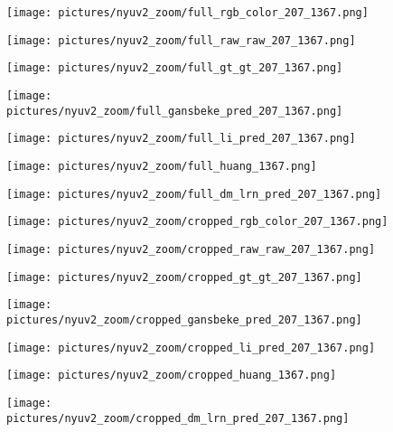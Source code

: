 \documentclass[final]{cvpr}
\begin{document}
    
    \begin{figure*}[!t]
    \setlength{\columnsep}{2pt}
    \setlength\multicolsep{0pt}
            \begin{multicols}{7}
            \texttt{[image: pictures/nyuv2\_zoom/full\_rgb\_color\_207\_1367.png]}\par
            \texttt{[image: pictures/nyuv2\_zoom/full\_raw\_raw\_207\_1367.png]}\par
            \texttt{[image: pictures/nyuv2\_zoom/full\_gt\_gt\_207\_1367.png]}\par 
            \texttt{[image: pictures/nyuv2\_zoom/full\_gansbeke\_pred\_207\_1367.png]}\par 
            \texttt{[image: pictures/nyuv2\_zoom/full\_li\_pred\_207\_1367.png]}\par
            \texttt{[image: pictures/nyuv2\_zoom/full\_huang\_1367.png]}\par 
            \texttt{[image: pictures/nyuv2\_zoom/full\_dm\_lrn\_pred\_207\_1367.png]}\par 
        \end{multicols}

        \begin{multicols}{7}
            \texttt{[image: pictures/nyuv2\_zoom/cropped\_rgb\_color\_207\_1367.png]}\par
            \texttt{[image: pictures/nyuv2\_zoom/cropped\_raw\_raw\_207\_1367.png]}\par
            \texttt{[image: pictures/nyuv2\_zoom/cropped\_gt\_gt\_207\_1367.png]}\par 
            \texttt{[image: pictures/nyuv2\_zoom/cropped\_gansbeke\_pred\_207\_1367.png]}\par 
            \texttt{[image: pictures/nyuv2\_zoom/cropped\_li\_pred\_207\_1367.png]}\par
            \texttt{[image: pictures/nyuv2\_zoom/cropped\_huang\_1367.png]}\par 
            \texttt{[image: pictures/nyuv2\_zoom/cropped\_dm\_lrn\_pred\_207\_1367.png]}\par 
        \end{multicols}


\end{figure*}
\end{document}
